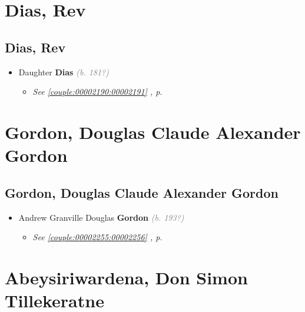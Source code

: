 \documentclass[10pt, openany]{book}
\begin{document}
\part{Dias, Rev}
\chapter{Dias, Rev}
\label{00002192}
\textcolor{slmaroon}{\textit{}}
\begin{itemize}
\item{Daughter \textbf{Dias} \textcolor{gray}{\textit{(b. 181?)}}
\begin{itemize}
\item{\textcolor{slteal}{\textit{See  \autoref{couple:00002190:00002191} \textit{, p. \pageref{couple:00002190:00002191} }}}}
\end{itemize}
 }
\end{itemize}
 
\part{Gordon, Douglas Claude Alexander Gordon}
\chapter{Gordon, Douglas Claude Alexander Gordon}
\label{00002257}
\textcolor{slmaroon}{\textit{}}
\begin{itemize}
\item{Andrew Granville Douglas \textbf{Gordon} \textcolor{gray}{\textit{(b. 193?)}}
\begin{itemize}
\item{\textcolor{slteal}{\textit{See  \autoref{couple:00002255:00002256} \textit{, p. \pageref{couple:00002255:00002256} }}}}
\end{itemize}
   }
\end{itemize}
    
\part{Abeysiriwardena, Don Simon Tillekeratne}
\end{document}
